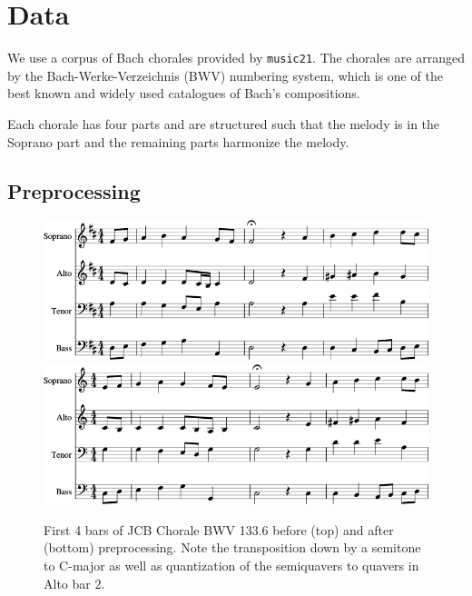 \chapter{Data}

We use a corpus of Bach chorales provided by \texttt{music21}. The chorales are
arranged by the Bach-Werke-Verzeichnis (BWV) numbering system, which is one of
the best known and widely used catalogues of Bach's compositions.

Each chorale has four parts and are structured such that the melody is in
the Soprano part and the remaining parts harmonize the melody.

\section{Preprocessing}

\begin{figure}[htbp]
    \centering
    \includegraphics[width=1.0\linewidth]{Figures/bwv133-6-original-score-1.png}
    \includegraphics[width=1.0\linewidth]{Figures/bwv133-6-preproc-score-1.png}
    \caption{First 4 bars of JCB Chorale BWV 133.6 before (top) and after (bottom) preprocessing. Note
    the transposition down by a semitone to C-major as well as quantization of the
    semiquavers to quavers in Alto bar 2.}
    \label{fig:score-effects-preproc}
\end{figure}

